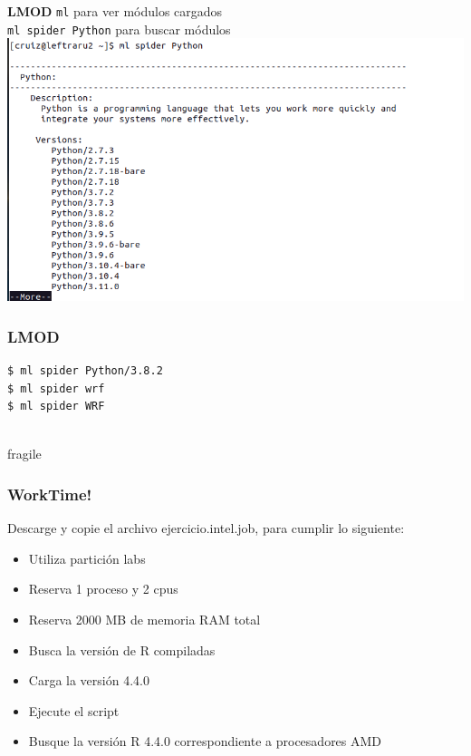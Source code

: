 \documentclass[aspectratio=169,professionalfonts]{beamer}
\begin{document}
\begin{frame}{\textbf{LMOD}}
    \texttt{ml} para ver módulos cargados \\ 
    \texttt{ml spider Python} para buscar módulos\\ 
\centering
    \includegraphics[scale=0.25]{FIGURES/ml_spider_python.png} \\
\end{frame} 

\begin{frame}[fragile]
\frametitle{\textbf{LMOD}}
\begin{verbatim}
$ ml spider Python/3.8.2
$ ml spider wrf
$ ml spider WRF
    
\end{verbatim}



\end{frame}

\begin{frame}{fragile}
\frametitle{\textbf{WorkTime!}}
Descarge y copie el archivo ejercicio.intel.job, para cumplir lo siguiente:
\begin{itemize}
    \item Utiliza partición labs 
         \vspace{0.5em} 
    \item Reserva 1 proceso y 2 cpus
         \vspace{0.5em} 
    \item Reserva 2000 MB de memoria RAM total   
    \vspace{0.5em} 
     \item Busca la versión de R compiladas
          \vspace{0.5em} 
   \item Carga la versión 4.4.0 
        \vspace{0.5em} 
    \item Ejecute el script 
         \vspace{0.5em} 
    \item Busque la versión R 4.4.0 correspondiente a procesadores AMD 
    
\end{itemize}
    
\end{frame}
\end{document}
